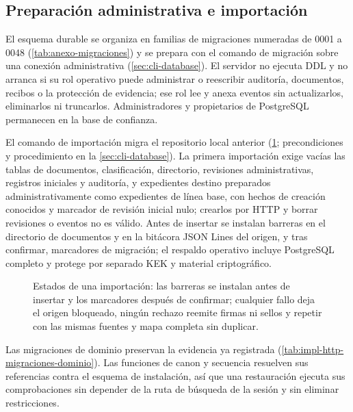\subsection{Preparación administrativa e importación}\label{sec:impl-http-migracion}

El esquema durable se organiza en familias de migraciones numeradas de 0001 a 0048 (\cref{tab:anexo-migraciones}) y se prepara con el comando de migración sobre una conexión administrativa (\cref{sec:cli-database}). El servidor no ejecuta DDL y no arranca si su rol operativo puede administrar o reescribir auditoría, documentos, recibos o la protección de evidencia; ese rol lee y anexa eventos sin actualizarlos, eliminarlos ni truncarlos. Administradores y propietarios de PostgreSQL permanecen en la base de confianza.

El comando de importación migra el repositorio local anterior (\cref{fig:impl-http-importacion}; precondiciones y procedimiento en la \cref{sec:cli-database}). La primera importación exige vacías las tablas de documentos, clasificación, directorio, revisiones administrativas, registros iniciales y auditoría, y expedientes destino preparados administrativamente como expedientes de línea base, con hechos de creación conocidos y marcador de revisión inicial nulo; crearlos por HTTP y borrar revisiones o eventos no es válido. Antes de insertar se instalan barreras en el directorio de documentos y en la bitácora JSON Lines del origen, y tras confirmar, marcadores de migración; el respaldo operativo incluye PostgreSQL completo y protege por separado KEK y material criptográfico.

\begin{figure}[!htbp]
  \centering
  
  \caption{Estados de una importación: las barreras se instalan antes de insertar y los marcadores después de confirmar; cualquier fallo deja el origen bloqueado, ningún rechazo reemite firmas ni sellos y repetir con las mismas fuentes y mapa completa sin duplicar.}
  \label{fig:impl-http-importacion}
\end{figure}

Las migraciones de dominio preservan la evidencia ya registrada (\cref{tab:impl-http-migraciones-dominio}). Las funciones de canon y secuencia resuelven sus referencias contra el esquema de instalación, así que una restauración ejecuta sus comprobaciones sin depender de la ruta de búsqueda de la sesión y sin eliminar restricciones.

